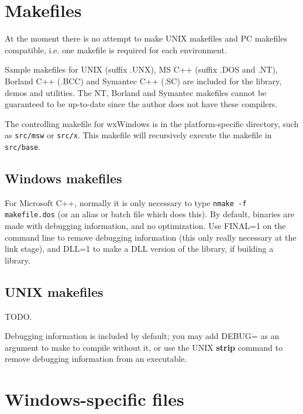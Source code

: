 \section{Makefiles}

At the moment there is no attempt to make UNIX makefiles and
PC makefiles compatible, i.e. one makefile is required for
each environment.

Sample makefiles for UNIX (suffix .UNX), MS C++ (suffix .DOS and .NT), Borland
C++ (.BCC) and Symantec C++ (.SC) are included for the library, demos
and utilities. The NT, Borland and Symantec makefiles cannot be
guaranteed to be up-to-date since the author does not have
these compilers.

The controlling makefile for wxWindows is in the platform-specific
directory, such as {\tt src/msw} or {\tt src/x}. This makefile will
recursively execute the makefile in {\tt src/base}.

\subsection{Windows makefiles}

For Microsoft C++, normally it is only necessary to type {\tt nmake -f
makefile.dos} (or an alias or batch file which does this). By default,
binaries are made with debugging information, and no optimization. Use
FINAL=1 on the command line to remove debugging information (this only
really necessary at the link stage), and DLL=1 to make a DLL version of
the library, if building a library.

\subsection{UNIX makefiles}

TODO.

Debugging information is included by default; you may add DEBUG= as an
argument to make to compile without it, or use the UNIX {\bf strip}
command to remove debugging information from an executable.


\section{Windows-specific files}

